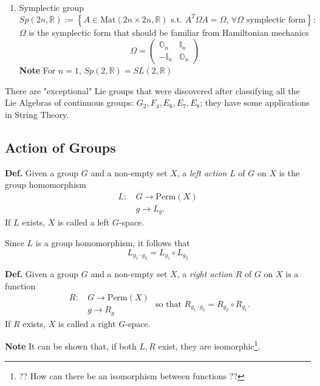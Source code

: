 \begin{enumerate}
        this group has the same dimension of $U(n)$ and it is one of the most
        important groups for physics, since $SU(2)$ is pivotal for the description
        of spin and of the Lorentz group; it has dimension $\dim(SU(n))=n^2-1$, since
        the condition $\det(A)=1=e^{i\alpha}$ constrains a parameter.
    \item Symplectic group
        $$Sp(2n,\mathbb{R}):=\left\{A\in\text{Mat}(2n\times 2n,\mathbb{R})
        \text{ s.t. } A^T\Omega A = \Omega,\,\forall\Omega\text{ symplectic form}
        \right\}:$$
        $\Omega$ is the symplectic form that should be familiar from Hamiltonian
        mechanics
        $$\Omega = \begin{pmatrix}
            \mathbb{O}_n&\mathbb{I}_n\\
            -\mathbb{I}_n&\mathbb{O}_n
        \end{pmatrix}
        $$
        \textbf{Note} For $n=1$, $Sp(2,\mathbb{R})=SL(2,\mathbb{R})$
\end{enumerate}

There are "exceptional" Lie groups that were discovered after classifying all the Lie
Algebras of continuous groups: $G_2,F_4,E_6,E_7,E_8$; they have some applications in
String Theory.

\subsection{Action of Groups}
\textbf{Def. }Given a group $G$ and a non-empty set $X$, a \textit{left action} $L$
of $G$ on $X$ is the group homomorphism
\begin{align*}
    L:\,&G\rightarrow\text{Perm}(X)\\
      &g\rightarrow L_g.
\end{align*}
If $L$ exists, $X$ is called a left $G$-space.

Since $L$ is a group homomorphism, it follows that
$$L_{g_1\cdot g_2} = L_{g_1}\circ L_{g_2}$$

\textbf{Def.} Given a group $G$ and a non-empty set $X$, a \textit{right action} $R$
of $G$ on $X$ is a function
$$\begin{aligned}
      R:\,&G\rightarrow\text{Perm}(X)\\
          &g\rightarrow R_g
  \end{aligned}\text{  so that } R_{g_1\cdot g_2} = R_{g_2}\circ R_{g_1}.
$$
If $R$ exists, $X$ is called a right $G$-space.

\textbf{Note} It can be shown that, if both $L,R$ exist, they are
isomorphic\footnote{?? How can there be an isomorphism between functions ??}.

